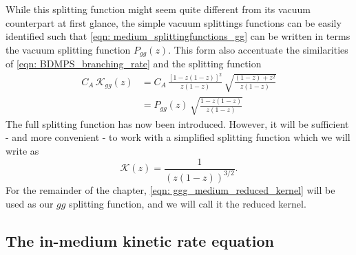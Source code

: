\documentclass[main.tex]{subfiles}
\begin{document}
While this splitting function might seem quite different from its vacuum counterpart at first glance, the simple vacuum splittings functions can be easily identified such that \autoref{eqn: medium_splittingfunctions_gg} can be written in terms the vacuum splitting function \(P_{gg}(z)\). This form also accentuate the similarities of \autoref{eqn: BDMPS_branching_rate} and the splitting function
\begin{align}\label{eqn: vacuumtomedium_ggg_splitting_relation}
    C_A\,\mathcal{K}_{gg}(z) &= C_A \, \frac{[1-z(1-z)]^2}{z(1-z)} \, \sqrt{\frac{(1-z)+ z^2 }{z(1-z)}} \nonumber \\
    &= P_{gg}(z) \,\sqrt{\frac{1-z(1-z)}{z(1-z)}}
\end{align}
The full splitting function has now been introduced. However, it will be sufficient - and more convenient - to work with a simplified splitting function which we will write as
\begin{equation}\label{eqn: ggg_medium_reduced_kernel}
    \mathcal{K}(z) = \frac{1}{\left( z(1-z)\right)^{3/2}}.
\end{equation}
For the remainder of the chapter, \autoref{eqn: ggg_medium_reduced_kernel} will be used as our \(gg\) splitting function, and we will call it the reduced kernel.

\subsection{The in-medium kinetic rate equation}\label{sec: BDMPS_theory}
\end{document}
